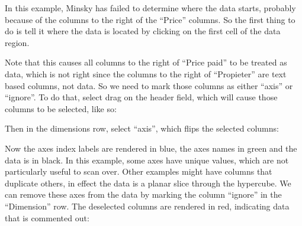 In this example, Minsky has failed to determine where the data starts,
probably because of the columns to the right of the ``Price''
columns. So the first thing to do is tell it where the data is located
by clicking on the first cell of the data region.

\begin{center}
\end{center}

Note that this causes all columns to the right of ``Price paid'' to be
treated as data, which is not right since the columns to the right of
``Propieter'' are text based columns, not data. So we need to mark
those columns as either ``axis'' or ``ignore''. To do that, select
drag on the header field, which will cause those columns to be
selected, like so:

\begin{center}
\end{center}

Then in the dimensions row, select ``axis'', which flips the selected
columns:

\begin{center}
\end{center}



Now the axes index labels are rendered in blue, the axes names in
green and the data is in black. In this example, some axes have unique
values, which are not particularly useful to scan over. Other examples
might have columns that duplicate others, in effect the data is a
planar slice through the hypercube. We can remove these axes from the
data by marking the column ``ignore'' in the ``Dimension'' row. The
deselected columns are rendered in red, indicating data that is
commented out:

\begin{center}
\end{center}

